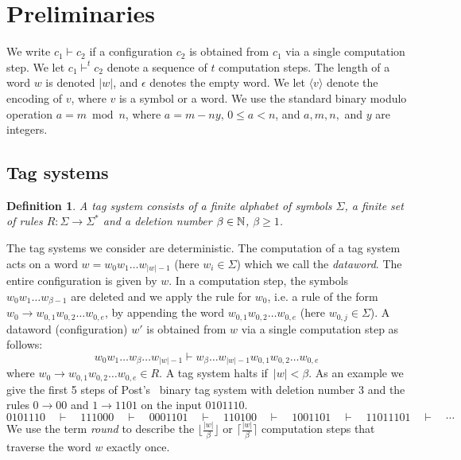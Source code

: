\documentclass[11pt]{article} \usepackage{amsfonts,amsmath,amssymb,amsthm}
\newtheorem{definition}{Definition}
\begin{document}
\section{Preliminaries}
We write $c_1\vdash c_2$ if a configuration $c_2$ is obtained from $c_1$ via a single computation step. We let $c_1\vdash^{t}c_2$ denote a sequence of $t$ computation steps. The length of a word $w$ is denoted $|w|$, and $\epsilon$ denotes the empty word. We let $\langle v\rangle$ denote the encoding of $v$, where $v$ is a symbol or a word. We use the standard binary modulo operation $a=m\bmod n$, where $a=m-ny$, $0\leqslant a<n$, and $a,m,n,$ and $y$ are integers. 


\subsection{Tag systems}\label{sect:Tag systems}
\begin{definition}\label{def:Tag System}
A tag system consists of a finite alphabet of symbols $\Sigma$, a finite set of rules $R : \Sigma\rightarrow\Sigma^{\ast}$ and a deletion number $\beta\in\mathbb{N}$, $\beta\geqslant 1$.
\end{definition}
The tag systems we consider are deterministic. 
The computation of a tag system acts on a word $w=w_0 w_1\ldots w_{|w|-1}$ (here $w_i\in\Sigma$) which we call the \emph{dataword}. The entire configuration is given by $w$. 
In a computation step, the symbols~$w_0 w_1\ldots w_{\beta-1}$ are deleted and we apply the rule for $w_0$, i.e. a rule of the form $w_0\rightarrow w_{0,1}w_{0,2}\ldots w_{0,e}$, by appending the word $w_{0,1}w_{0,2}\ldots w_{0,e}$ (here $w_{0,j}\in\Sigma$). A dataword (configuration) $w'$ is obtained from $w$ via a single computation step as follows:
\begin{equation*}
w_0 w_1\ldots w_{\beta}\ldots w_{|w|-1} \vdash w_{\beta}\ldots w_{|w|-1}w_{0,1}w_{0,2}\ldots w_{0,e}
\end{equation*}
where $w_0\rightarrow w_{0,1}w_{0,2}\ldots w_{0,e} \in R$. 
A tag system halts if~$|w|< \beta $. As an example we give the first 5 steps of Post's~\cite{Post1965} binary tag system with deletion number 3 and the rules $0\rightarrow 00$ and $1\rightarrow 1101$ on the input $0101110$.
\begin{equation*}
010 1110 \quad\vdash\quad 111 000 \quad\vdash\quad 000 1101 \quad\vdash\quad 110 100  \quad\vdash\quad 100 1101 \quad\vdash\quad 11011101 \quad\vdash\quad \cdots  
\end{equation*}
We use the term \emph{round} to describe the $\lfloor \frac{|w|}{\beta}\rfloor$ or $\lceil \frac{|w|}{\beta}\rceil$ computation steps that traverse the word $w$ exactly once.
\end{document}

